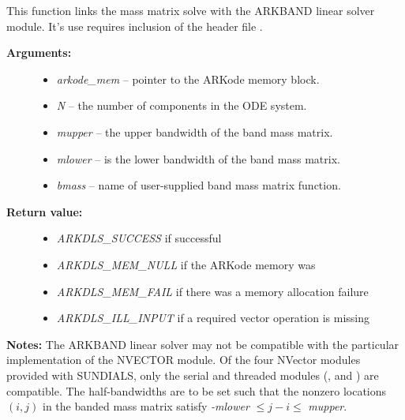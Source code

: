 \documentclass[letterpaper,10pt,english]{sphinxmanual}
\begin{document}
\begin{fulllineitems}
\label{c_interface/User_callable:c.ARKMassBand}
This function links the mass matrix solve with the ARKBAND linear
solver module.  It's use requires inclusion of the header file
.
\begin{description}
\item[{\textbf{Arguments:}}] \leavevmode\begin{itemize}
\item {} 
\emph{arkode\_mem} -- pointer to the ARKode memory block.

\item {} 
\emph{N} -- the number of components in the ODE system.

\item {} 
\emph{mupper} -- the upper bandwidth of the band mass matrix.

\item {} 
\emph{mlower} -- is the lower bandwidth of the band mass matrix.

\item {} 
\emph{bmass} -- name of user-supplied band mass matrix function.

\end{itemize}

\item[{\textbf{Return value:}}] \leavevmode\begin{itemize}
\item {} 
\emph{ARKDLS\_SUCCESS}   if successful

\item {} 
\emph{ARKDLS\_MEM\_NULL}  if the ARKode memory was 

\item {} 
\emph{ARKDLS\_MEM\_FAIL}  if there was a memory allocation failure

\item {} 
\emph{ARKDLS\_ILL\_INPUT} if a required vector operation is missing

\end{itemize}

\end{description}

\textbf{Notes:} The ARKBAND linear solver may not be compatible with the
particular implementation of the NVECTOR module. Of the four NVector
modules provided with SUNDIALS, only the serial and threaded
modules ({\hyperref[nvectors/NVector_Serial:nvectors-nvserial]{\emph{}}}, {\hyperref[nvectors/NVector_OpenMP:nvectors-openmp]{\emph{}}} and
{\hyperref[nvectors/NVector_Pthreads:nvectors-pthreads]{\emph{}}}) are compatible.  The half-bandwidths are
to be set such that the nonzero locations \((i, j)\) in the
banded mass matrix satisfy \emph{-mlower} \(\le j-i \le\) \emph{mupper}.


\end{fulllineitems}
\end{document}

